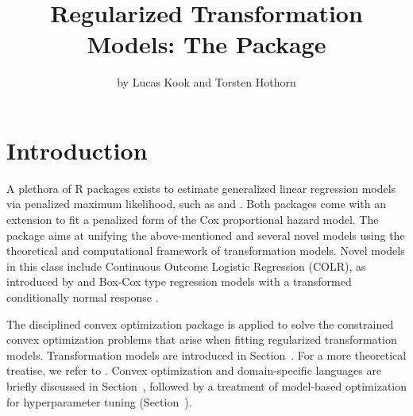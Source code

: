 \title{Regularized Transformation Models: The  Package}
\author{by Lucas Kook and Torsten Hothorn}

\maketitle


\section{Introduction}

A plethora of \textsf{R} packages exists to estimate generalized linear regression
models via penalized maximum likelihood, such as 
\citep{penalizedpaper} and  \citep{glmnetpaper}. Both packages come
with an extension to fit a penalized form of the Cox proportional hazard model.
The  package aims at unifying the above-mentioned and several
novel models using the theoretical and computational framework of
transformation models. Novel models in this class include Continuous Outcome
Logistic Regression (COLR), as introduced by \citet{COLRpaper} and Box-Cox type
regression models with a transformed conditionally normal response \citep{boxcox,
pkg:tram}. 

The disciplined convex optimization package  \citep{CVXRpaper} is
applied to solve the constrained convex optimization problems that arise
when fitting regularized transformation models.  Transformation models are
introduced in Section~. For a more theoretical treatise, we
refer to \citet{ctmpaper, mltpaper, mltjss}.  Convex optimization and domain-specific 
languages are briefly discussed in Section~,
followed by a treatment of model-based optimization for hyperparameter
tuning (Section~).

